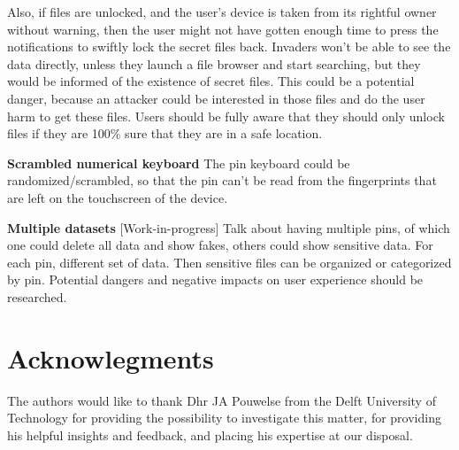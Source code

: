 \documentclass[twocolumn,english,compsoc,journal]{IEEEtran}
\begin{document}
Also, if files are unlocked, and the user's device is taken from
its rightful owner without warning, then the user might not have
gotten enough time to press the notifications to swiftly lock
the secret files back. Invaders won't be able to see the data
directly, unless they launch a file browser and start searching,
but they would be informed of the existence of secret files.
This could be a potential danger, because an attacker could be
interested in those files and do the user harm to get these
files. Users should be fully aware that they should only unlock
files if they are 100\% sure that they are in a safe location.

\textbf{Scrambled numerical keyboard}
The pin keyboard could be randomized/scrambled, so that
the pin can't be read from the fingerprints that are left on the touchscreen
of the device. 

\textbf{Multiple datasets}
[Work-in-progress] Talk about having multiple pins, of which
one could delete all data and show fakes, others could show
sensitive data. For each pin, different set of data. Then
sensitive files can be organized or categorized by pin.
Potential dangers and negative impacts on user experience should
be researched.


\section*{Acknowlegments}

The authors would like to thank Dhr JA Pouwelse from the Delft University of Technology for providing the possibility to investigate this matter, for providing his helpful insights and feedback, and placing his expertise at our disposal.



\end{document}
